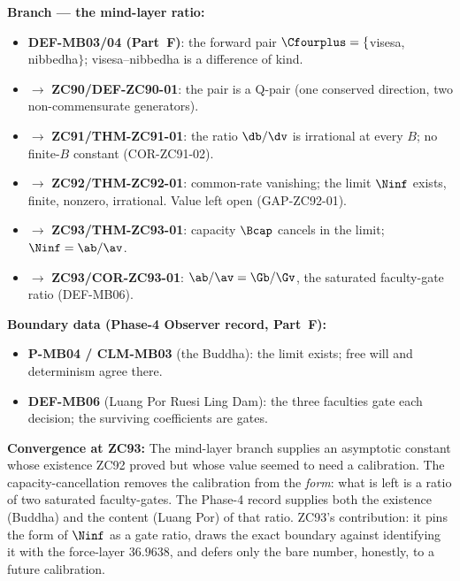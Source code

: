 \documentclass[12pt, a4paper]{article}
\begin{document}
\begin{genealogybox}[title={How ZC93's Key Objects Trace Back}]

\textbf{Branch --- the mind-layer ratio:}
\begin{itemize}[leftmargin=2em, noitemsep]
  \item \textbf{DEF-MB03/04 (Part~F)}: the forward pair $\Cfourplus=\{$visesa,
    nibbedha$\}$; visesa--nibbedha is a difference of kind.
  \item $\to$ \textbf{ZC90/DEF-ZC90-01}: the pair is a Q-pair (one conserved
    direction, two non-commensurate generators).
  \item $\to$ \textbf{ZC91/THM-ZC91-01}: the ratio $\db/\dv$ is irrational at
    every $B$; no finite-$B$ constant (COR-ZC91-02).
  \item $\to$ \textbf{ZC92/THM-ZC92-01}: common-rate vanishing; the limit
    $\Ninf$ exists, finite, nonzero, irrational. Value left open
    (GAP-ZC92-01).
  \item $\to$ \textbf{ZC93/THM-ZC93-01}: capacity $\Bcap$ cancels in the
    limit; $\Ninf=\ab/\av$.
  \item $\to$ \textbf{ZC93/COR-ZC93-01}: $\ab/\av=\Gb/\Gv$, the saturated
    faculty-gate ratio (DEF-MB06).
\end{itemize}

\textbf{Boundary data (Phase-4 Observer record, Part~F):}
\begin{itemize}[leftmargin=2em, noitemsep]
  \item \textbf{P-MB04 / CLM-MB03} (the Buddha): the limit exists; free will
    and determinism agree there.
  \item \textbf{DEF-MB06} (Luang Por Ruesi Ling Dam): the three faculties gate
    each decision; the surviving coefficients are gates.
\end{itemize}

\textbf{Convergence at ZC93:}
The mind-layer branch supplies an asymptotic constant whose existence ZC92
proved but whose value seemed to need a calibration. The capacity-cancellation
removes the calibration from the \emph{form}: what is left is a ratio of two
saturated faculty-gates. The Phase-4 record supplies both the existence (Buddha)
and the content (Luang Por) of that ratio. ZC93's contribution: it pins the
form of $\Ninf$ as a gate ratio, draws the exact boundary against identifying
it with the force-layer $36.9638$, and defers only the bare number, honestly,
to a future calibration.
\end{genealogybox}
\end{document}
